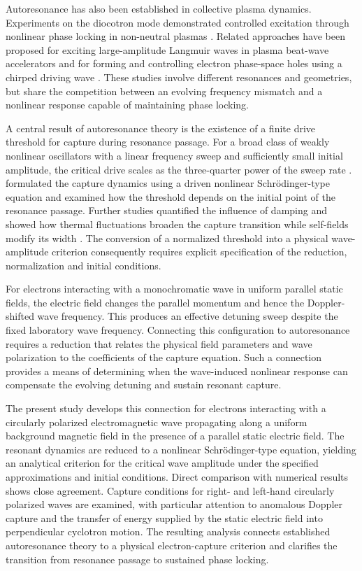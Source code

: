 \documentclass[11pt,a4paper]{article}
\begin{document}
Autoresonance has also been established in collective plasma dynamics. Experiments on the diocotron mode demonstrated controlled excitation through nonlinear phase locking in non-neutral plasmas \citep{Fajans1999Collective,Fajans1999Diocotron}. Related approaches have been proposed for exciting large-amplitude Langmuir waves in plasma beat-wave accelerators \citep{Lindberg2004} and for forming and controlling electron phase-space holes using a chirped driving wave \citep{FriedlandKhainShagalov2006}. These studies involve different resonances and geometries, but share the competition between an evolving frequency mismatch and a nonlinear response capable of maintaining phase locking.

A central result of autoresonance theory is the existence of a finite drive threshold for capture during resonance passage. For a broad class of weakly nonlinear oscillators with a linear frequency sweep and sufficiently small initial amplitude, the critical drive scales as the three-quarter power of the sweep rate \citep{FajansFriedland2001}. \citet{Friedland2008} formulated the capture dynamics using a driven nonlinear Schr\"odinger-type equation and examined how the threshold depends on the initial point of the resonance passage. Further studies quantified the influence of damping \citep{FajansGilsonFriedland2001} and showed how thermal fluctuations broaden the capture transition while self-fields modify its width \citep{Barth2009}. The conversion of a normalized threshold into a physical wave-amplitude criterion consequently requires explicit specification of the reduction, normalization and initial conditions.

For electrons interacting with a monochromatic wave in uniform parallel static fields, the electric field changes the parallel momentum and hence the Doppler-shifted wave frequency. This produces an effective detuning sweep despite the fixed laboratory wave frequency. Connecting this configuration to autoresonance requires a reduction that relates the physical field parameters and wave polarization to the coefficients of the capture equation. Such a connection provides a means of determining when the wave-induced nonlinear response can compensate the evolving detuning and sustain resonant capture.

The present study develops this connection for electrons interacting with a circularly polarized electromagnetic wave propagating along a uniform background magnetic field in the presence of a parallel static electric field. The resonant dynamics are reduced to a nonlinear Schr\"odinger-type equation, yielding an analytical criterion for the critical wave amplitude under the specified approximations and initial conditions. Direct comparison with numerical results shows close agreement. Capture conditions for right- and left-hand circularly polarized waves are examined, with particular attention to anomalous Doppler capture and the transfer of energy supplied by the static electric field into perpendicular cyclotron motion. The resulting analysis connects established autoresonance theory to a physical electron-capture criterion and clarifies the transition from resonance passage to sustained phase locking.



\end{document}
